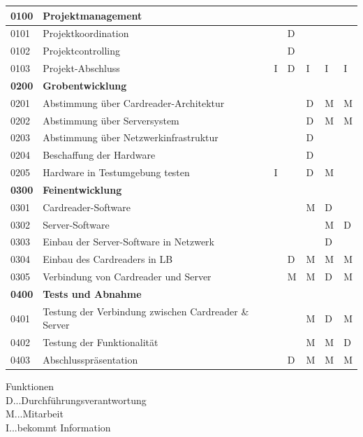 \begin{scriptsize}
\begin{center}
\begin{tabularx}{\textwidth}{|p{1.5cm}|p{5cm}|X|X|X|X|X|}
    \hline
    \textbf{0100} & \textbf{Projektmanagement} & & & & & \\
    \hline
    0101 & Projektkoordination & &D & & & \\
    \hline
    0102 & Projektcontrolling & & D& & & \\
    \hline
    0103 & Projekt-Abschluss & I& D& I& I& I\\
    \hline
    \textbf{0200} & \textbf{Grobentwicklung} & & & & & \\
    \hline
    0201 & Abstimmung über Cardreader-Architektur& & &D & M& M\\
    \hline
    0202 & Abstimmung über Serversystem & & &D &M &M \\
    \hline
    0203 & Abstimmung über Netzwerkinfrastruktur& & &D & & \\
    \hline
    0204 & Beschaffung der Hardware& & &D & & \\
    \hline
    0205 & Hardware in Testumgebung testen& I &&D &M & \\
    \hline
    \textbf{0300} & \textbf{Feinentwicklung} & & & & & \\
    \hline
    0301 & Cardreader-Software& & & M&D & \\
    \hline
    0302 & Server-Software& & & &M &D \\
    \hline
    0303 & Einbau der Server-Software in Netzwerk& & & &D & \\
    \hline
    0304 & Einbau des Cardreaders in LB& &D & M& M& M\\
    \hline
    0305 & Verbindung von Cardreader und Server& & M& M&D &M \\
    \hline
    \textbf{0400} & \textbf{Tests und Abnahme} & & & & & \\
    \hline
    0401 & Testung der Verbindung zwischen Cardreader \& Server& & &M &D &M \\
    \hline
    0402 & Testung der Funktionalität & & &M &M &D \\
    \hline
    0403 & Abschlusspräsentation & & D& M& M&M \\
    
    \hline 
\end{tabularx}
\end{center}
\end{scriptsize}
\endgroup

\begin{flushleft}
\footnotesize Funktionen \\
\footnotesize D...Durchführungsverantwortung \\
\footnotesize M...Mitarbeit \\
\footnotesize I...bekommt Information
\end{flushleft}

